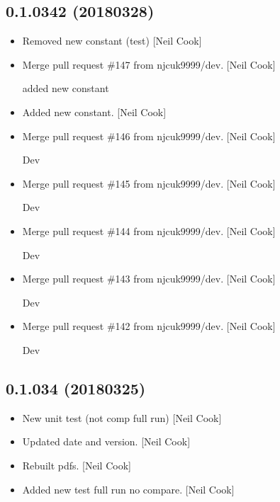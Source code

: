 \documentclass[a4paper,10pt,english]{report}
\begin{document}
\subsection{0.1.0342 (2018\sphinxhyphen{}03\sphinxhyphen{}28)}
\label{\detokenize{misc/changelog:id488}}\begin{itemize}
\item {} 
Removed new constant (test) {[}Neil Cook{]}

\item {} 
Merge pull request \#147 from njcuk9999/dev. {[}Neil Cook{]}

added new constant

\item {} 
Added new constant. {[}Neil Cook{]}

\item {} 
Merge pull request \#146 from njcuk9999/dev. {[}Neil Cook{]}

Dev

\item {} 
Merge pull request \#145 from njcuk9999/dev. {[}Neil Cook{]}

Dev

\item {} 
Merge pull request \#144 from njcuk9999/dev. {[}Neil Cook{]}

Dev

\item {} 
Merge pull request \#143 from njcuk9999/dev. {[}Neil Cook{]}

Dev

\item {} 
Merge pull request \#142 from njcuk9999/dev. {[}Neil Cook{]}

Dev

\end{itemize}


\subsection{0.1.034 (2018\sphinxhyphen{}03\sphinxhyphen{}25)}
\label{\detokenize{misc/changelog:id489}}\begin{itemize}
\item {} 
New unit test (not comp full run) {[}Neil Cook{]}

\item {} 
Updated date and version. {[}Neil Cook{]}

\item {} 
Rebuilt pdfs. {[}Neil Cook{]}

\item {} 
Added new test full run no compare. {[}Neil Cook{]}

\end{itemize}
\end{document}
